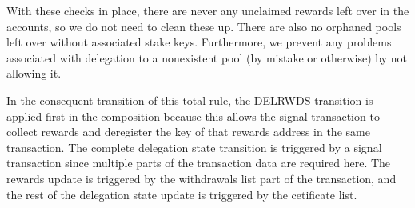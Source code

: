 \documentclass[11pt,a4paper,dvipsnames]{article}
\theoremstyle{definition}
\theoremstyle{definition}
\begin{document}
With these checks in place, there are never any unclaimed rewards left over
in the accounts, so we do not need to clean these up. There are also
no orphaned pools left over without associated stake keys. Furthermore, we
prevent any problems associated with delegation to a nonexistent pool
(by mistake or otherwise) by not allowing it.

In the consequent transition of this total rule, the DELRWDS transition is
applied first in the composition
because this allows the signal transaction to collect rewards
and deregister the key of that rewards address in the same transaction. The
complete delegation state transition is triggered by a signal transaction
since multiple parts of the transaction data are required here. The rewards
update is triggered by the withdrawals list part of the transaction, and the
rest of the delegation state update is triggered by the cetificate list.
\end{document}

